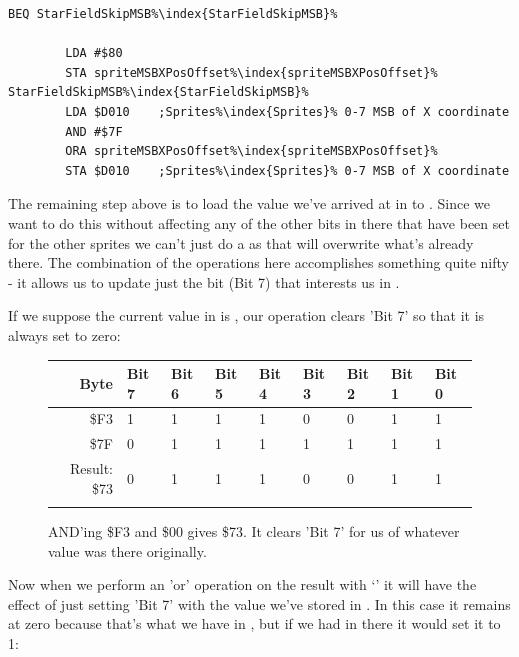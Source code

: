 \begin{lstlisting}[escapechar=\%]
        BEQ StarFieldSkipMSB%\index{StarFieldSkipMSB}%

        LDA #$80
        STA spriteMSBXPosOffset%\index{spriteMSBXPosOffset}%
StarFieldSkipMSB%\index{StarFieldSkipMSB}%   
        LDA $D010    ;Sprites%\index{Sprites}% 0-7 MSB of X coordinate
        AND #$7F
        ORA spriteMSBXPosOffset%\index{spriteMSBXPosOffset}%
        STA $D010    ;Sprites%\index{Sprites}% 0-7 MSB of X coordinate
\end{lstlisting}

The remaining step above is to load the value we've arrived at in  to . Since we
want to do this without affecting any of the other bits in there that have been set for the other sprites we can't
just do a  as that will overwrite what's already there. The combination of the  operations
here accomplishes something quite nifty - it allows us to update just the bit (Bit 7) that interests us in .

If we suppose the current value in  is , our  operation clears 'Bit 7' so that
it is always set to zero:

\begin{figure}[H]
  {
    \setlength{\tabcolsep}{3.0pt}
    \setlength\cmidrulewidth{\heavyrulewidth} %
    \begin{adjustbox}{width=10cm,center}

      \begin{tabular}{rllllllll}
        \toprule
        Byte & Bit 7 & Bit 6 & Bit 5 & Bit 4 & Bit 3 & Bit 2 & Bit 1 & Bit 0        \\
        \midrule
        \$F3 & 1 & 1 & 1 & 1 & 0 & 0 & 1 & 1 \\
        \$7F & 0 & 1 & 1 & 1 & 1 & 1 & 1 & 1 \\
        \midrule
        Result: \$73 & 0 & 1 & 1 & 1 & 0 & 0 & 1 & 1 \\
        \addlinespace
        \bottomrule
      \end{tabular}
    \end{adjustbox}
  }\caption*{AND'ing \$F3 and \$00 gives \$73. It clears 'Bit 7' for us of whatever value was there originally.}
\end{figure}

Now when we perform an 'or' operation on the result with `' it will have the effect of just setting 'Bit 7'
with the value we've stored in . In this case it remains at zero because that's what we have in
, but if we had  in there it would set it to 1: 

